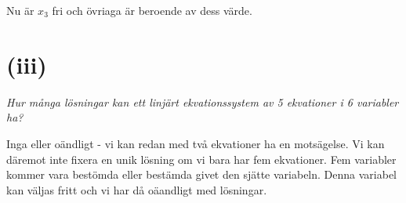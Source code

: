 \documentclass[a4paper, 11pt]{article}
\begin{document}
Nu är $x_3$ fri och övriaga är beroende av dess värde. 



\section*{(iii)}

{\em Hur många lösningar kan ett linjärt ekvationssystem av 5 ekvationer i 6 variabler ha?}

Inga eller oändligt - vi kan redan med två ekvationer ha en
motsägelse. Vi kan däremot inte fixera en unik lösning om vi bara har
fem ekvationer. Fem variabler kommer vara bestömda eller bestämda
givet den sjätte variabeln. Denna variabel kan väljas fritt och vi har
då oäandligt med lösningar.
\end{document}
